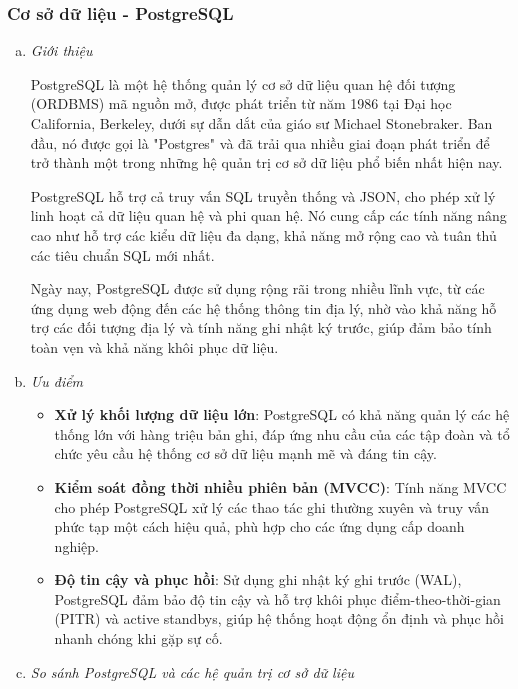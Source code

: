 \subsubsection{Cơ sở dữ liệu - PostgreSQL}
    \begin{enumerate}[(a)]
        \item \textit{Giới thiệu}
        
            PostgreSQL là một hệ thống quản lý cơ sở dữ liệu quan hệ đối tượng (ORDBMS) mã nguồn mở, được phát triển từ năm 1986 tại Đại học California, Berkeley, dưới sự dẫn dắt của giáo sư Michael Stonebraker. Ban đầu, nó được gọi là "Postgres" và đã trải qua nhiều giai đoạn phát triển để trở thành một trong những hệ quản trị cơ sở dữ liệu phổ biến nhất hiện nay. 

            PostgreSQL hỗ trợ cả truy vấn SQL truyền thống và JSON, cho phép xử lý linh hoạt cả dữ liệu quan hệ và phi quan hệ. Nó cung cấp các tính năng nâng cao như hỗ trợ các kiểu dữ liệu đa dạng, khả năng mở rộng cao và tuân thủ các tiêu chuẩn SQL mới nhất.

            Ngày nay, PostgreSQL được sử dụng rộng rãi trong nhiều lĩnh vực, từ các ứng dụng web động đến các hệ thống thông tin địa lý, nhờ vào khả năng hỗ trợ các đối tượng địa lý và tính năng ghi nhật ký trước, giúp đảm bảo tính toàn vẹn và khả năng khôi phục dữ liệu.
                    
        \item \textit{Ưu điểm}

        \begin{itemize}
            \item \textbf{Xử lý khối lượng dữ liệu lớn}: PostgreSQL có khả năng quản lý các hệ thống lớn với hàng triệu bản ghi, đáp ứng nhu cầu của các tập đoàn và tổ chức yêu cầu hệ thống cơ sở dữ liệu mạnh mẽ và đáng tin cậy. 
            \item \textbf{Kiểm soát đồng thời nhiều phiên bản (MVCC)}: Tính năng MVCC cho phép PostgreSQL xử lý các thao tác ghi thường xuyên và truy vấn phức tạp một cách hiệu quả, phù hợp cho các ứng dụng cấp doanh nghiệp.
            \item \textbf{Độ tin cậy và phục hồi}: Sử dụng ghi nhật ký ghi trước (WAL), PostgreSQL đảm bảo độ tin cậy và hỗ trợ khôi phục điểm-theo-thời-gian (PITR) và active standbys, giúp hệ thống hoạt động ổn định và phục hồi nhanh chóng khi gặp sự cố.
        \end{itemize}

        \item \textit{So sánh PostgreSQL và các hệ quản trị cơ sở dữ liệu}
        

\end{enumerate}
